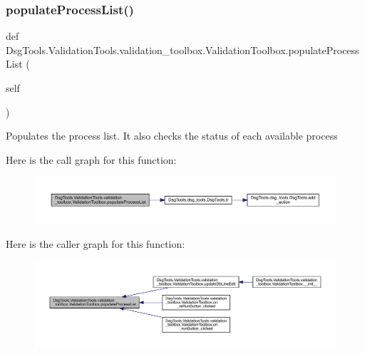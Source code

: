 \subsubsection{\texorpdfstring{populate\+Process\+List()}{populateProcessList()}}
{\footnotesize\ttfamily def Dsg\+Tools.\+Validation\+Tools.\+validation\+\_\+toolbox.\+Validation\+Toolbox.\+populate\+Process\+List (\begin{DoxyParamCaption}\item[{}]{self }\end{DoxyParamCaption})}

\begin{DoxyVerb}Populates the process list. It also checks the status of each available process
\end{DoxyVerb}
 Here is the call graph for this function\+:
\nopagebreak
\begin{figure}[H]
\begin{center}
\leavevmode
\includegraphics[width=350pt]{class_dsg_tools_1_1_validation_tools_1_1validation__toolbox_1_1_validation_toolbox_a60c2886f451186f458452f26fd8517f1_cgraph}
\end{center}
\end{figure}
Here is the caller graph for this function\+:
\nopagebreak
\begin{figure}[H]
\begin{center}
\leavevmode
\includegraphics[width=350pt]{class_dsg_tools_1_1_validation_tools_1_1validation__toolbox_1_1_validation_toolbox_a60c2886f451186f458452f26fd8517f1_icgraph}
\end{center}
\end{figure}
\mbox{\label{class_dsg_tools_1_1_validation_tools_1_1validation__toolbox_1_1_validation_toolbox_aabc3539ed5006b88a9d99263769fcf30}} 
